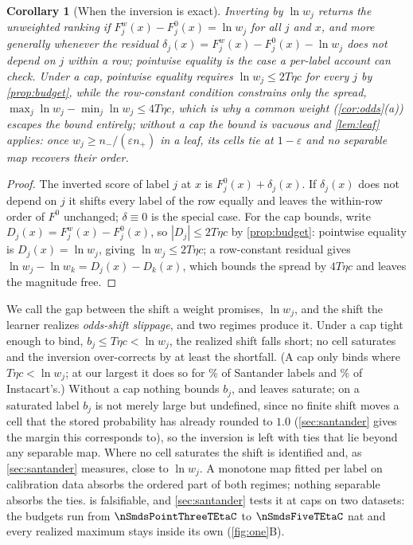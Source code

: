 \documentclass[sigconf,nonacm]{acmart}
\newtheorem{corollary}{Corollary}
\begin{document}
\begin{corollary}[When the inversion is exact]
\label{cor:exact}
Inverting by $\ln w_j$ returns the unweighted ranking if $F^{w}_j(x)-F^{0}_j(x)=\ln w_j$ for all $j$ and $x$, and more generally whenever the residual $\delta_j(x)=F^{w}_j(x)-F^{0}_j(x)-\ln w_j$ does not depend on $j$ within a row; pointwise equality is the case a per-label account can check. Under a cap, pointwise equality requires $\ln w_j\le 2T\eta c$ for every $j$ by \cref{prop:budget}, while the row-constant condition constrains only the spread, $\max_j\ln w_j-\min_j\ln w_j\le 4T\eta c$, which is why a common weight (\cref{cor:odds}(a)) escapes the bound entirely; without a cap the bound is vacuous and \cref{lem:leaf} applies: once $w_j\ge n_-/(\varepsilon n_+)$ in a leaf, its cells tie at $1-\varepsilon$ and no separable map recovers their order.
\end{corollary}
\begin{proof}
The inverted score of label $j$ at $x$ is $F^{0}_j(x)+\delta_j(x)$. If $\delta_j(x)$ does not depend on $j$ it shifts every label of the row equally and leaves the within-row order of $F^{0}$ unchanged; $\delta\equiv0$ is the special case. For the cap bounds, write $D_j(x)=F^{w}_j(x)-F^{0}_j(x)$, so $|D_j|\le 2T\eta c$ by \cref{prop:budget}: pointwise equality is $D_j(x)=\ln w_j$, giving $\ln w_j\le 2T\eta c$; a row-constant residual gives $\ln w_j-\ln w_k=D_j(x)-D_k(x)$, which bounds the spread by $4T\eta c$ and leaves the magnitude free.
\end{proof}

We call the gap between the shift a weight promises, $\ln w_j$, and the shift the learner realizes \emph{odds-shift slippage}, and two regimes produce it. Under a cap tight enough to bind, $b_j\le T\eta c<\ln w_j$, the realized shift falls short; no cell saturates and the inversion over-corrects by at least the shortfall. (A cap only binds where $T\eta c<\ln w_j$; at our largest it does so for \nSmdsFivefracLnwAbove\% of Santander labels and \nISmdsFivefracLnwAbove\% of Instacart's.) Without a cap nothing bounds $b_j$, and leaves saturate; on a saturated label $b_j$ is not merely large but undefined, since no finite shift moves a cell that the stored probability has already rounded to $1.0$ (\cref{sec:santander} gives the margin this corresponds to), so the inversion is left with ties that lie beyond any separable map. Where no cell saturates the shift is identified and, as \cref{sec:santander} measures, close to $\ln w_j$. A monotone map fitted per label on calibration data absorbs the ordered part of both regimes; nothing separable absorbs the ties.  is falsifiable, and \cref{sec:santander} tests it at \ncapN{} caps on two datasets: the budgets run from $\nSmdsPointThreeTEtaC$ to $\nSmdsFiveTEtaC$ nat and every realized maximum stays inside its own (\cref{fig:one}B).
\end{document}
